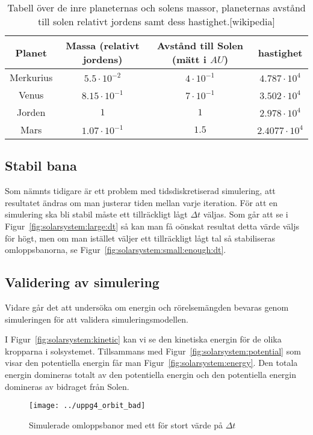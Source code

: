 \documentclass[a4]{article}
\begin{document}
\begin{table}
\begin{center}
\begin{tabular}{c|c|c|c}
	Planet    & Massa (relativt jordens) & Avstånd till Solen (mätt i $AU$) & hastighet\\
	\hline
	Merkurius & $5.5 \cdot 10^{-2}$  & $4 \cdot 10^{-1}$  &  $4.787 \cdot 10^4$ \\
	Venus     & $8.15 \cdot 10^{-1}$ & $7 \cdot 10^{-1}$  &  $3.502 \cdot 10^4$ \\ 
	Jorden    & $1$                  & $1$                &  $2.978 \cdot 10^4$ \\
	Mars      & $1.07 \cdot 10^{-1}$ & $1.5$              &  $2.4077 \cdot 10^4$
\end{tabular}
\caption{
	Tabell över de inre planeternas och solens massor, planeternas avstånd till
	solen relativt jordens samt dess hastighet.[wikipedia]
}
\label{solarsystem:data}
\end{center}
\end{table}
	

		\subsection{Stabil bana}
Som nämnts tidigare är ett problem med tidsdiskretiserad simulering, att
resultatet ändras om man justerar tiden mellan varje iteration.
För att en simulering ska bli stabil måste ett tillräckligt lågt $\Delta t$
väljas.
Som går att se i Figur~\vref{fig:solarsystem:large:dt} så kan man få oönskat
resultat detta värde väljs för högt, men om man istället väljer ett
tillräckligt lågt tal så stabiliseras omloppsbanorna, se
Figur~\vref{fig:solarsystem:small:enough:dt}.


		\subsection{Validering av simulering}
Vidare går det att undersöka om energin och rörelsemängden
bevaras genom simuleringen för att validera
simuleringsmodellen.

I Figur~\vref{fig:solarsystem:kinetic} kan vi se den kinetiska energin för de olika kropparna i solsystemet.
Tillsammans med Figur~\vref{fig:solarsystem:potential} som visar den potentiella energin får man 
Figur~\vref{fig:solarsystem:energy}.
Den totala energin domineras totalt av den potentiella energin och den potentiella energin domineras av bidraget från Solen.
\begin{figure}
\begin{center}
	\texttt{[image: ../uppg4\_orbit\_bad]}
\end{center}
\caption{Simulerade omloppsbanor med ett för stort värde på $\Delta t$}
\label{fig:solarsystem:large:dt}
\end{figure}
\end{document}
